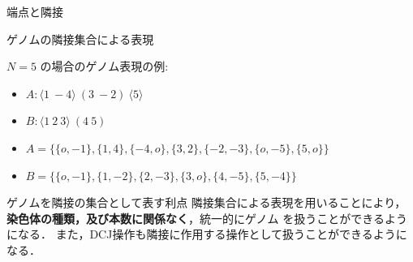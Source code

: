 \documentclass[unicode, 11pt, aspectratio=169]{beamer}
\begin{document}
\begin{frame}{端点と隣接}
\end{frame}

\begin{frame}{ゲノムの隣接集合による表現}

    $N=5$ の場合のゲノム表現の例:
    \begin{itemize}
        \item $A: \langle 1 \ -4 \rangle \ ( 3 \ -2 ) \ \langle 5 \rangle$
        \item $B: \langle 1 \ 2 \ 3 \rangle \ ( 4 \ 5 )$
    \end{itemize}

    \begin{itemize}
        \item $A = \{ \{ o, -1 \}, \{ 1, 4 \}, \{ -4, o \}, \{ 3, 2 \}, \{ -2, -3 \}, \{ o, -5 \}, \{ 5, o \} \}$
        \item $B = \{ \{ o, -1 \}, \{ 1, -2 \}, \{ 2, -3 \}, \{ 3, o \}, \{ 4, -5 \}, \{ 5, -4 \} \}$
    \end{itemize}

    \vspace{0.5em}
    \begin{alertblock}{ゲノムを隣接の集合として表す利点}
        隣接集合による表現を用いることにより，
        \textbf{染色体の種類，及び本数に関係なく}，統一的にゲノム
        を扱うことができるようになる．
        また，DCJ操作も隣接に作用する操作として扱うことができるようになる．
    \end{alertblock}
\end{frame}
\end{document}
